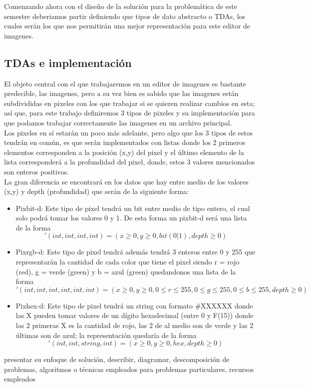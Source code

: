 Comenzando ahora con el diseño de la solución para la problemática de este semestre
 deberiamos partir definiendo que tipos de dato abstracto o TDAs, los cuales serán los que 
 nos permitirán una mejor representación para este editor de imagenes.

 \subsection{TDAs e implementación}
 El objeto central con el que trabajaremos en un editor de imagenes es bastante predecible, 
 las imagenes, pero a su vez bien es sabido que las imagenes están subdivididas en 
  pixeles con los que trabajar si se quieren realizar
 cambios en esta; así que, para este trabajo definiremos 3 tipos de pixeles y su implementación para que 
 podamos trabajar correctamente las imagenes en un archivo principal.\\

Los pixeles en sí estarán un poco más adelante, pero algo que los 3 tipos de estos tendrán en común, es que serán implementados con listas 
donde los 2 primeros elementos corresponden a la posición (x,y) del pixel y el último elemento de la lista
 corresponderá a la profundidad del pixel, donde, estos 3 valores mencionados son enteros positivos.\\

 La gran diferencia se encontrará en los datos que hay entre medio de los valores (x,y) y depth (profundidad) que
 serán de la siguiente forma:
 \begin{itemize}
    \item Pixbit-d: Este tipo de pixel tendrá un bit entre medio de tipo entero, el cual solo podrá 
    tomar los valores 0 y 1. De esta forma un pixbit-d será una lista de la forma
    \begin{equation*}
        '(int, int, int, int) = (x \geq 0, y \geq 0, bit(0|1), depth \geq 0) 
    \end{equation*}
     
    \item Pixrgb-d: Este tipo de pixel tendrá además tendrá 3 enteros entre 0 y 255 que representarán la 
    cantidad de cada color que tiene el pixel siendo r = rojo (red), g = verde (green) y b = azul (green)
    quedandonos una lista de la forma
    \begin{equation*}
        '(int, int, int, int, int, int) = (x \geq 0, y \geq 0, 0 \leq r \leq 255, 0 \leq g \leq 255, 0 \leq b \leq 255, depth \geq 0) 
    \end{equation*}
    
    \item Pixhex-d: Este tipo de pixel tendrá un string con formato \#XXXXXX donde las X pueden tomar valores de un dígito hexadecimal (entre 0 y F(15))
    donde las 2 primeras X es la cantidad de rojo, las 2 de al medio son de verde y las 2 últimas son de azul; la representación quedaría de la forma
    \begin{equation*}
        '(int, int, string, int) = (x \geq 0, y \geq 0, hex, depth \geq 0) 
    \end{equation*}
 \end{itemize}

 presentar su enfoque de solución, describir, diagramar, 
 descomposición de problemas, algoritmos o técnicas empleados para
  problemas particulares, recursos empleados